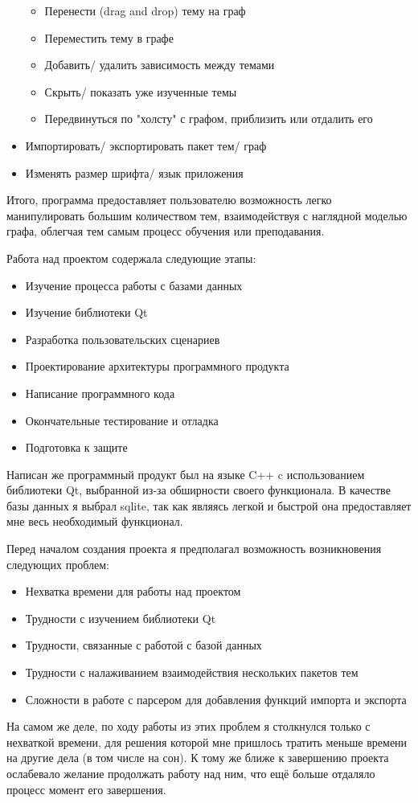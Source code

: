 \documentclass[a4paper,14pt]{extarticle}
\begin{document}
\begin{itemize}
\begin{itemize}
        \item Перенести (drag and drop) тему на граф
        \item Переместить тему в графе
        \item Добавить/ удалить зависимость между темами
        \item Скрыть/ показать уже изученные темы
        \item Передвинуться по "холсту" с графом, приблизить или отдалить его
    \end{itemize}
    \item Импортировать/ экспортировать пакет тем/ граф
    \item Изменять размер шрифта/ язык приложения
\end{itemize}

Итого, программа предоставляет пользователю возможность легко
манипулировать большим количеством тем, взаимодействуя с наглядной моделью графа,
облегчая тем самым процесс обучения или преподавания.

Работа над проектом содержала следующие этапы:

\begin{itemize}
    \item Изучение процесса работы с базами данных
    \item Изучение библиотеки Qt
    \item Разработка пользовательских сценариев
    \item Проектирование архитектуры программного продукта
    \item Написание программного кода
    \item Окончательные тестирование и отладка
    \item Подготовка к защите
\end{itemize}

Написан же программный продукт был на языке C++ c использованием библиотеки Qt,
выбранной из-за обширности своего функционала. В качестве базы данных я выбрал
sqlite, так как являясь легкой и быстрой она предоставляет мне весь необходимый
функционал.

Перед началом создания проекта я предполагал возможность возникновения следующих проблем:
\begin{itemize}
    \item Нехватка времени для работы над проектом
    \item Трудности с изучением библиотеки Qt
    \item Трудности, связанные с работой с базой данных
    \item Трудности с налаживанием взаимодействия нескольких пакетов тем
    \item Сложности в работе с парсером для добавления функций импорта и экспорта
\end{itemize}
На самом же деле, по ходу работы из этих проблем я столкнулся только с
нехваткой времени, для решения которой мне пришлось тратить меньше времени на
другие дела (в том числе на сон). К тому же ближе к завершению проекта
ослабевало желание продолжать работу над ним, что ещё больше отдаляло процесс
момент его завершения.
\end{document}

